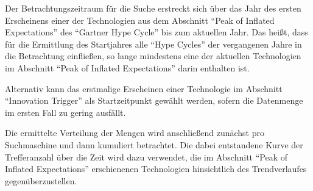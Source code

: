Der Betrachtungszeitraum für die Suche erstreckt sich über das Jahr des ersten Erscheinens einer der Technologien aus dem Abschnitt "`Peak of Inflated Expectations"' des "`Gartner Hype Cycle"' bis zum aktuellen Jahr. Das heißt, dass für die Ermittlung des Startjahres alle "`Hype Cycles"' der vergangenen Jahre in die Betrachtung einfließen, so lange mindestens eine der aktuellen Technologien im Abschnitt "`Peak of Inflated Expectations"' darin enthalten ist.

Alternativ kann das erstmalige Erscheinen einer Technologie im Abschnitt "`Innovation Trigger"' als Startzeitpunkt gewählt werden, sofern die Datenmenge im ersten Fall zu gering ausfällt.

Die ermittelte Verteilung der Mengen wird anschließend zunächst pro Suchmaschine und dann kumuliert betrachtet. Die dabei entstandene Kurve der Trefferanzahl über die Zeit wird dazu verwendet, die im Abschnitt "`Peak of Inflated Expectations"' erschienenen Technologien hinsichtlich des Trendverlaufes gegenüberzustellen.